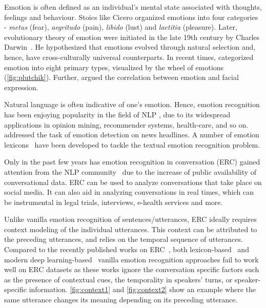 \documentclass{IEEEtran}\usepackage[pdftex]{graphicx}
\begin{document}
	Emotion is often defined as an individual's mental state associated with thoughts, feelings
	and behaviour. 
	Stoics like Cicero organized emotions into four categories - {\it metus} (fear), {\it aegritudo} (pain), {\it libido} (lust) and {\it laetitia} (pleasure).
	Later, evolutionary theory of emotion were initiated in the late 19th century by Charles Darwin~\citep{darwin1998expression}. He hypothesized that emotions evolved through natural selection and, hence, have cross-culturally universal counterparts. In recent times, \citet{plutchik}
	categorized emotion into eight primary types, visualized by the wheel of
	emotions (\cref{fig:plutchik}). Further, \citet{ekman1993facial} argued the correlation
	between emotion and facial expression. 
	
	Natural language is
	often indicative of one's emotion. Hence, emotion recognition has
	been enjoying popularity in the field of NLP  \citep{kratzwald2018decision, colneric2018emotion}, due to its widespread applications in
	opinion mining, recommender systems, health-care, and so on. \citet{Strapparava:2007:STA:1621474.1621487} addressed the task of  emotion detection on news headlines. A number of emotion lexicons~\citep{strapparava2004wordnet,mohammad2010emotions} have been developed to tackle the textual emotion recognition problem. 
	
	Only in the past few years has emotion recognition in conversation (ERC) gained attention from the NLP community~\citep{yeh2019interaction, chen2018emotionlines,majumder2019dialoguernn,zhou2018emotional} 
	due to the increase of public availability of conversational data. ERC can be used to analyze
	conversations that take place on social media. It can also aid in analyzing conversations in real times, which can be instrumental in legal trials, interviews, e-health services and more.
	
	Unlike vanilla emotion recognition of sentences/utterances, ERC ideally requires context
	modeling of the individual utterances. This context can be attributed to the preceding
	utterances, and relies on the temporal sequence of utterances.
	Compared to the recently published works on ERC~\citep{chen2018emotionlines,majumder2019dialoguernn,zhou2018emotional}, both lexicon-based~\citep{wu2006emotion,mohammad2010emotions, shaheen2014emotion} and modern deep learning-based~\citep{kratzwald2018decision, colneric2018emotion} vanilla emotion recognition approaches fail to work well on ERC datasets as these works ignore the conversation specific factors such as the presence of contextual cues, the temporality in speakers' turns, or speaker-specific information. \cref{fig:context1} and \cref{fig:context2} show an example where the same
	utterance changes its meaning depending on its preceding utterance. 
	
\end{document}

